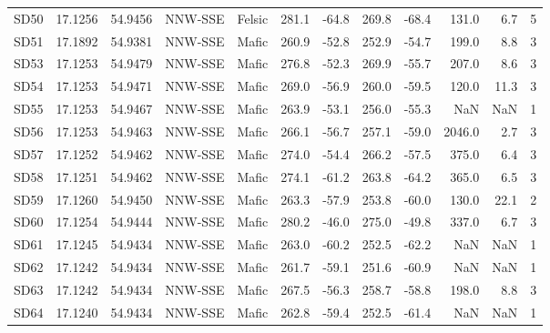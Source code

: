\begin{tabular}{lrrllrrrrrrr}
SD50 & 17.1256 & 54.9456 &     NNW-SSE & Felsic  &        281.1 &        -64.8 &       269.8 &       -68.4 &   131.0 &          6.7 &                5 \\
SD51 & 17.1892 & 54.9381 &     NNW-SSE &  Mafic  &        260.9 &        -52.8 &       252.9 &       -54.7 &   199.0 &          8.8 &                3 \\
SD53 & 17.1253 & 54.9479 &     NNW-SSE &  Mafic  &        276.8 &        -52.3 &       269.9 &       -55.7 &   207.0 &          8.6 &                3 \\
SD54 & 17.1253 & 54.9471 &     NNW-SSE &  Mafic  &        269.0 &        -56.9 &       260.0 &       -59.5 &   120.0 &         11.3 &                3 \\
SD55 & 17.1253 & 54.9467 &     NNW-SSE &  Mafic  &        263.9 &        -53.1 &       256.0 &       -55.3 &     NaN &          NaN &                1 \\
SD56 & 17.1253 & 54.9463 &     NNW-SSE &  Mafic  &        266.1 &        -56.7 &       257.1 &       -59.0 &  2046.0 &          2.7 &                3 \\
SD57 & 17.1252 & 54.9462 &     NNW-SSE &  Mafic  &        274.0 &        -54.4 &       266.2 &       -57.5 &   375.0 &          6.4 &                3 \\
SD58 & 17.1251 & 54.9462 &     NNW-SSE &  Mafic  &        274.1 &        -61.2 &       263.8 &       -64.2 &   365.0 &          6.5 &                3 \\
SD59 & 17.1260 & 54.9450 &     NNW-SSE &  Mafic  &        263.3 &        -57.9 &       253.8 &       -60.0 &   130.0 &         22.1 &                2 \\
SD60 & 17.1254 & 54.9444 &     NNW-SSE &  Mafic  &        280.2 &        -46.0 &       275.0 &       -49.8 &   337.0 &          6.7 &                3 \\
SD61 & 17.1245 & 54.9434 &     NNW-SSE &  Mafic  &        263.0 &        -60.2 &       252.5 &       -62.2 &     NaN &          NaN &                1 \\
SD62 & 17.1242 & 54.9434 &     NNW-SSE &  Mafic  &        261.7 &        -59.1 &       251.6 &       -60.9 &     NaN &          NaN &                1 \\
SD63 & 17.1242 & 54.9434 &     NNW-SSE &  Mafic  &        267.5 &        -56.3 &       258.7 &       -58.8 &   198.0 &          8.8 &                3 \\
SD64 & 17.1240 & 54.9434 &     NNW-SSE &  Mafic  &        262.8 &        -59.4 &       252.5 &       -61.4 &     NaN &          NaN &                1 \\

\end{tabular}
